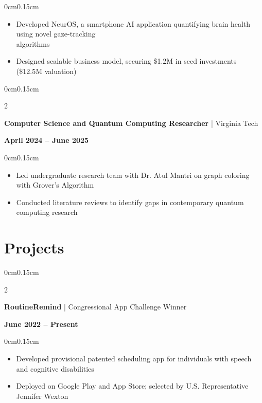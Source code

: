 \documentclass[10pt, letterpaper]{article}
\newenvironment{highlights}{
    \begin{itemize}[topsep=0pt, parsep=0pt, partopsep=0pt, itemsep=0pt, leftmargin=0.4cm]
}{
    \end{itemize}
}
\newenvironment{onecolentry}{
    \begin{adjustwidth}{0cm}{0.15cm}
}{
    \end{adjustwidth}
}
\newenvironment{twocolentry}[2][]{
    \onecolentry
    \def\secondColumn{#2}
    \setcolumnwidth{\fill, 4cm}
    \begin{paracol}{2}
}{
    \switchcolumn \raggedleft \secondColumn
    \end{paracol}
    \endonecolentry
}
\begin{document}
    \vspace{0.05cm}
    \begin{onecolentry}
        \begin{highlights}
            \item Developed NeurOS, a smartphone AI application quantifying brain health using novel gaze-tracking\\algorithms
            \item Designed scalable business model, securing \$1.2M in seed investments (\$12.5M valuation)
        \end{highlights}
    \end{onecolentry}

    \vspace{0.1cm}

    \begin{twocolentry}{\textbf{April 2024 -- June 2025}}
        \textbf{Computer Science and Quantum Computing Researcher} | Virginia Tech
    \end{twocolentry}

    \vspace{0.05cm}
    \begin{onecolentry}
        \begin{highlights}
            \item Led undergraduate research team with Dr. Atul Mantri on graph coloring with Grover's Algorithm
            \item Conducted literature reviews to identify gaps in contemporary quantum computing research
        \end{highlights}
    \end{onecolentry}

    \section{Projects}
    \vspace{0.05cm}

    \begin{twocolentry}{\textbf{June 2022 -- Present}}
        \textbf{RoutineRemind} | Congressional App Challenge Winner
    \end{twocolentry}

    \vspace{0.05cm}
    \begin{onecolentry}
        \begin{highlights}
            \item Developed provisional patented scheduling app for individuals with speech and cognitive disabilities
            \item Deployed on Google Play and App Store; selected by U.S. Representative Jennifer Wexton
        \end{highlights}
    \end{onecolentry}
\end{document}
